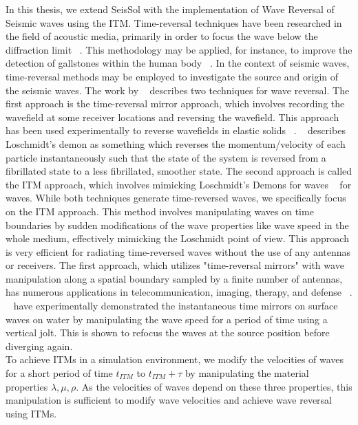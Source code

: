In this thesis, we extend SeisSol with the implementation of Wave Reversal of Seismic waves using the \acf{ITM}. 
Time-reversal techniques have been researched in the field of acoustic media, primarily in order to focus the wave below
the diffraction limit ~\parencite{67072}. This methodology may be applied, for instance, to improve the detection of gallstones within the human body ~\parencite{10.1063/1.881692}. 
In the context of seismic waves, time-reversal methods may be employed to investigate the source and origin of the seismic waves.
The work by ~\parencite{Fink2017} describes two techniques for wave reversal. The first approach is the time-reversal mirror approach, which involves recording the wavefield at some 
receiver locations and reversing the wavefield. This approach has been used experimentally to reverse wavefields in elastic solids ~\parencite{PhysRevLett.100.064301}.
~\parencite{Weinert2016} describes Loschmidt's demon as something which reverses the momentum/velocity of each particle instantaneously such that the state of the system is reversed 
from a fibrillated state to a less fibrillated, smoother state. The second approach is called the \acf{ITM} approach, which involves
mimicking Loschmidt's Demons for waves ~\parencite{Fink2017} for waves. 
While both techniques generate time-reversed waves, we specifically focus on the \ac{ITM} approach. 
This method involves manipulating waves on time boundaries by sudden modifications of the wave properties like wave speed in the whole medium, 
effectively mimicking the Loschmidt point of view. 
This approach is very efficient for radiating time-reversed waves without the use of any antennas or receivers. 
The first approach, which utilizes "time-reversal mirrors" with wave manipulation along a spatial boundary sampled by a finite number of antennas, has numerous applications in telecommunication, imaging, therapy, and defense ~\parencite{Fink2017}. 
~\parencite{Bacot2016} have experimentally demonstrated the instantaneous time mirrors on surface waves on water by manipulating the wave speed for a period of time using a vertical jolt.
This is shown to refocus the waves at the source position before diverging again.\\

To achieve \ac{ITM}s in a simulation environment, we modify the velocities of waves for a short period of time $t_{ITM}$ to $t_{ITM} + \tau$ by manipulating 
the material properties $\lambda, \mu, \rho$. As the velocities of waves depend on these three properties, this manipulation is 
sufficient to modify wave velocities and achieve wave reversal using \ac{ITM}s.


